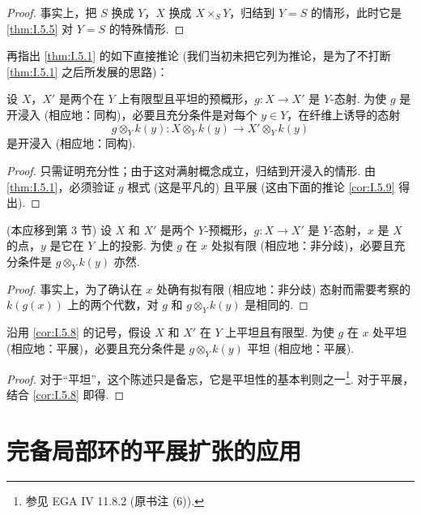 \begin{proof}
事实上，把 $S$ 换成 $Y$，$X$ 换成 $X \times_S Y$，归结到 $Y = S$ 的情形，此时它是 \ref{thm:I.5.5} 对 $Y = S$ 的特殊情形.
\end{proof}

再指出 \ref{thm:I.5.1} 的如下直接推论 (我们当初未把它列为推论，是为了不打断 \ref{thm:I.5.1} 之后所发展的思路)：

\begin{proposition}\label{prop:I.5.7}
设 $X$，$X'$ 是两个在 $Y$ 上有限型且平坦的预概形，$g \colon X \to X'$ 是 $Y$-态射. 为使 $g$ 是开浸入 (相应地：同构)，必要且充分条件是对每个 $y \in Y$，在纤维上诱导的态射
\[
g \otimes_Y k(y) \colon X \otimes_Y k(y) \longrightarrow X' \otimes_Y k(y)
\]
是开浸入 (相应地：同构).
\end{proposition}

\begin{proof}
只需证明充分性；由于这对满射概念成立，归结到开浸入的情形. 由 \ref{thm:I.5.1}，必须验证 $g$ 根式 (这是平凡的) 且平展 (这由下面的推论 \ref{cor:I.5.9} 得出).
\end{proof}

\begin{corollary}\label{cor:I.5.8}
(本应移到第 3 节) 设 $X$ 和 $X'$ 是两个 $Y$-预概形，$g \colon X \to X'$ 是 $Y$-态射，$x$ 是 $X$ 的点，$y$ 是它在 $Y$ 上的投影. 为使 $g$ 在 $x$ 处拟有限 (相应地：非分歧)，必要且充分条件是 $g \otimes_Y k(y)$ 亦然.
\end{corollary}

\begin{proof}
事实上，为了确认在 $x$ 处确有拟有限 (相应地：非分歧) 态射而需要考察的 $k(g(x))$ 上的两个代数，对 $g$ 和 $g \otimes_Y k(y)$ 是相同的.
\end{proof}

\begin{corollary}\label{cor:I.5.9}
沿用 \ref{cor:I.5.8} 的记号，假设 $X$ 和 $X'$ 在 $Y$ 上平坦且有限型. 为使 $g$ 在 $x$ 处平坦 (相应地：平展)，必要且充分条件是 $g \otimes_Y k(y)$ 平坦 (相应地：平展).
\end{corollary}

\begin{proof}
对于``平坦''，这个陈述只是备忘，它是平坦性的基本判则之一\footnote{参见 EGA IV 11.8.2 (原书注 (6)).}. 对于平展，结合 \ref{cor:I.5.8} 即得.
\end{proof}

\section{完备局部环的平展扩张的应用}

